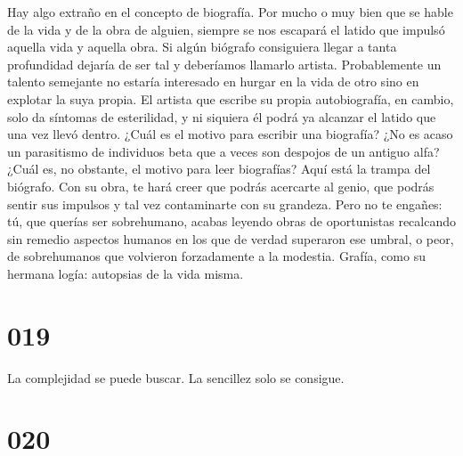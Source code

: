 \documentclass[a4paper,11pt,openright,twocolumn]{book}
\begin{document}
Hay algo extraño en el concepto de biografía. Por mucho o muy bien que se hable de la vida y de la obra de alguien, siempre se nos escapará el latido que impulsó aquella vida y aquella obra. Si algún biógrafo consiguiera llegar a tanta profundidad dejaría de ser tal y deberíamos llamarlo artista. Probablemente un talento semejante no estaría interesado en hurgar en la vida de otro sino en explotar la suya propia. El artista que escribe su propia autobiografía, en cambio, solo da síntomas de esterilidad, y ni siquiera él podrá ya alcanzar el latido que una vez llevó dentro. ¿Cuál es el motivo para escribir una biografía? ¿No es acaso un parasitismo de individuos beta que a veces son despojos de un antiguo alfa? ¿Cuál es, no obstante, el motivo para leer biografías? Aquí está la trampa del biógrafo. Con su obra, te hará creer que podrás acercarte al genio, que podrás sentir sus impulsos y tal vez contaminarte con su grandeza. Pero no te engañes: tú, que querías ser sobrehumano, acabas leyendo obras de oportunistas recalcando sin remedio aspectos humanos en los que de verdad superaron ese umbral, o peor, de sobrehumanos que volvieron forzadamente a la modestia. Grafía, como su hermana logía: autopsias de la vida misma.  

\section*{019}

La complejidad se puede buscar. La sencillez solo se consigue.

\section*{020}
\end{document}
